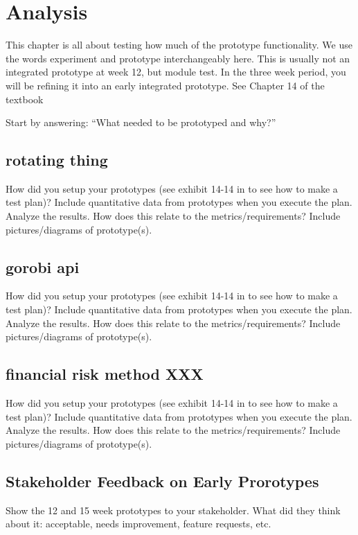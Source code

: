\chapter{Analysis\label{cha:analysis}}
This chapter is all about testing how much of the prototype functionality.
We use the words experiment and prototype interchangeably here.
This is usually not an integrated prototype at week 12, but module test.
In the three week period, you will be refining it into an early integrated prototype.
See Chapter 14 of the textbook\cite{ulrich2020product-design-development}

Start by answering: "`What needed to be prototyped and why?"'

\section{ rotating thing}
How did you setup your prototypes (see exhibit 14-14 in \cite{ulrich2020product-design-development} to see how to make a test plan)?
Include quantitative data from prototypes when you execute the plan.
Analyze the results.
How does this relate to the metrics/requirements?
Include pictures/diagrams of prototype(s).

\section{ gorobi api}
How did you setup your prototypes (see exhibit 14-14 in \cite{ulrich2020product-design-development} to see how to make a test plan)?
Include quantitative data from prototypes when you execute the plan.
Analyze the results.
How does this relate to the metrics/requirements?
Include pictures/diagrams of prototype(s).


\section{  financial risk method XXX}
How did you setup your prototypes (see exhibit 14-14 in \cite{ulrich2020product-design-development} to see how to make a test plan)?
Include quantitative data from prototypes when you execute the plan.
Analyze the results.
How does this relate to the metrics/requirements?
Include pictures/diagrams of prototype(s).

\section{Stakeholder Feedback on Early Prorotypes}
Show the 12 and 15 week prototypes to your stakeholder.
What did they think about it:  acceptable, needs improvement, feature requests, etc.

